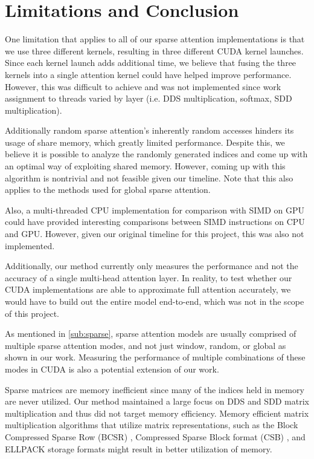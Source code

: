 \documentclass[11pt]{article}
\begin{document}
\section{Limitations and Conclusion}
One limitation that applies to all of our sparse attention implementations is that we use three different kernels, resulting in three different CUDA kernel launches. Since each kernel launch adds additional time, we believe that fusing the three kernels into a single attention kernel could have helped improve performance. However, this was difficult to achieve and was not implemented since work assignment to threads varied by layer (i.e. DDS multiplication, softmax, SDD multiplication).

Additionally random sparse attention's inherently random accesses hinders its usage of share memory, which greatly limited performance. Despite this, we believe it is possible to analyze the randomly generated indices and come up with an optimal way of exploiting shared memory. However, coming up with this algorithm is nontrivial and not feasible given our timeline. Note that this also applies to the methods used for global sparse attention.

Also, a multi-threaded CPU implementation for comparison with SIMD on GPU could have provided interesting comparisons between SIMD instructions on CPU and GPU. However, given our original timeline for this project, this was also not implemented.

Additionally, our method currently only measures the performance and not the accuracy of a single multi-head attention layer. In reality, to test whether our CUDA implementations are able to approximate full attention accurately, we would have to build out the entire model end-to-end, which was not in the scope of this project.

As mentioned in \autoref{sub:sparse}, sparse attention models are usually comprised of multiple sparse attention modes, and not just window, random, or global as shown in our work. Measuring the performance of multiple combinations of these modes in CUDA is also a potential extension of our work.

Sparse matrices are memory inefficient since many of the indices held in memory are never utilized. Our method maintained a large focus on DDS and SDD matrix multiplication and thus did not target memory efficiency. Memory efficient matrix multiplication algorithms that utilize matrix representations, such as the Block Compressed Sparse Row (BCSR) \cite{giannoula2022sparsep}, Compressed Sparse Block format (CSB) \cite{bulucc2009parallel}, and ELLPACK \cite{bell2009implementing} storage formats might result in better utilization of memory. 
\end{document}
